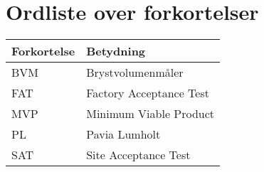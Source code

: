 \section*{Ordliste over forkortelser}

\vspace{1cm}
\begin{table}[hbt]
\centering
\label{ordliste}
\begin{tabular}{|l|l|}
\hline
\textbf{Forkortelse             } & \textbf{Betydning             } \\ \hline
BVM & Brystvolumenmåler \\ \hline
FAT & Factory Acceptance Test\\ \hline
MVP & Minimum Viable Product \\ \hline
PL & Pavia Lumholt \\ \hline
SAT & Site Acceptance Test\\ \hline
\end{tabular}
\end{table}